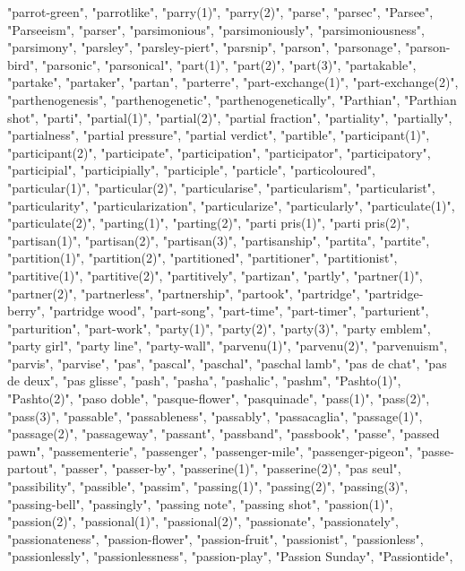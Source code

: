 "parrot-green",
"parrotlike",
"parry(1)",
"parry(2)",
"parse",
"parsec",
"Parsee",
"Parseeism",
"parser",
"parsimonious",
"parsimoniously",
"parsimoniousness",
"parsimony",
"parsley",
"parsley-piert",
"parsnip",
"parson",
"parsonage",
"parson-bird",
"parsonic",
"parsonical",
"part(1)",
"part(2)",
"part(3)",
"partakable",
"partake",
"partaker",
"partan",
"parterre",
"part-exchange(1)",
"part-exchange(2)",
"parthenogenesis",
"parthenogenetic",
"parthenogenetically",
"Parthian",
"Parthian shot",
"parti",
"partial(1)",
"partial(2)",
"partial fraction",
"partiality",
"partially",
"partialness",
"partial pressure",
"partial verdict",
"partible",
"participant(1)",
"participant(2)",
"participate",
"participation",
"participator",
"participatory",
"participial",
"participially",
"participle",
"particle",
"particoloured",
"particular(1)",
"particular(2)",
"particularise",
"particularism",
"particularist",
"particularity",
"particularization",
"particularize",
"particularly",
"particulate(1)",
"particulate(2)",
"parting(1)",
"parting(2)",
"parti pris(1)",
"parti pris(2)",
"partisan(1)",
"partisan(2)",
"partisan(3)",
"partisanship",
"partita",
"partite",
"partition(1)",
"partition(2)",
"partitioned",
"partitioner",
"partitionist",
"partitive(1)",
"partitive(2)",
"partitively",
"partizan",
"partly",
"partner(1)",
"partner(2)",
"partnerless",
"partnership",
"partook",
"partridge",
"partridge-berry",
"partridge wood",
"part-song",
"part-time",
"part-timer",
"parturient",
"parturition",
"part-work",
"party(1)",
"party(2)",
"party(3)",
"party emblem",
"party girl",
"party line",
"party-wall",
"parvenu(1)",
"parvenu(2)",
"parvenuism",
"parvis",
"parvise",
"pas",
"pascal",
"paschal",
"paschal lamb",
"pas de chat",
"pas de deux",
"pas glisse",
"pash",
"pasha",
"pashalic",
"pashm",
"Pashto(1)",
"Pashto(2)",
"paso doble",
"pasque-flower",
"pasquinade",
"pass(1)",
"pass(2)",
"pass(3)",
"passable",
"passableness",
"passably",
"passacaglia",
"passage(1)",
"passage(2)",
"passageway",
"passant",
"passband",
"passbook",
"passe",
"passed pawn",
"passementerie",
"passenger",
"passenger-mile",
"passenger-pigeon",
"passe-partout",
"passer",
"passer-by",
"passerine(1)",
"passerine(2)",
"pas seul",
"passibility",
"passible",
"passim",
"passing(1)",
"passing(2)",
"passing(3)",
"passing-bell",
"passingly",
"passing note",
"passing shot",
"passion(1)",
"passion(2)",
"passional(1)",
"passional(2)",
"passionate",
"passionately",
"passionateness",
"passion-flower",
"passion-fruit",
"passionist",
"passionless",
"passionlessly",
"passionlessness",
"passion-play",
"Passion Sunday",
"Passiontide",
